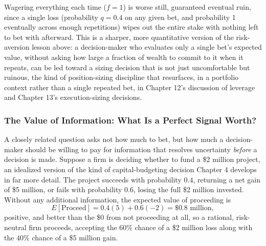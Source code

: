 \documentclass[../ai_in_finance]{subfiles}
\begin{document}
Wagering everything each time ($f=1$) is worse still, guaranteed eventual ruin, since a single loss (probability $q=0.4$ on any given bet, and probability 1 eventually across enough repetitions) wipes out the entire stake with nothing left to bet with afterward. This is a sharper, more quantitative version of the risk-aversion lesson above: a decision-maker who evaluates only a single bet's expected value, without asking how large a fraction of wealth to commit to it when it repeats, can be led toward a sizing decision that is not just uncomfortable but ruinous, the kind of position-sizing discipline that resurfaces, in a portfolio context rather than a single repeated bet, in Chapter 12's discussion of leverage and Chapter 13's execution-sizing decisions.

\subsubsection*{The Value of Information: What Is a Perfect Signal Worth?}

A closely related question asks not how much to bet, but how much a decision-maker should be willing to pay for information that resolves uncertainty \emph{before} a decision is made. Suppose a firm is deciding whether to fund a \$2 million project, an idealized version of the kind of capital-budgeting decision Chapter 4 develops in far more detail. The project succeeds with probability $0.4$, returning a net gain of \$5 million, or fails with probability $0.6$, losing the full \$2 million invested. Without any additional information, the expected value of proceeding is
\begin{equation*}
E[\text{Proceed}] = 0.4(5) + 0.6(-2) = \$0.8 \text{ million},
\end{equation*}
positive, and better than the \$0 from not proceeding at all, so a rational, risk-neutral firm proceeds, accepting the $60\%$ chance of a \$2 million loss along with the $40\%$ chance of a \$5 million gain.
\end{document}
